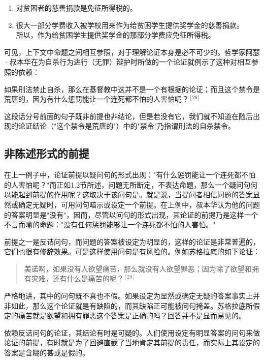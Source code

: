\begin{enumerate}
  \item 对贫困者的慈善捐款是免征所得税的。
  \item 很大一部分学费收入被学校用来作为给贫困学生提供奖学金的慈善捐款。\\
  所以，作为给贫困学生提供奖学金的那部分学费应免征所得税。
\end{enumerate}

可见，上下文中命题之间相互参照，对于理解论证本身是必不可少的。哲学家阿瑟·叔本华在为自杀行为进行（无罪）辩护时所做的一个论证就例示了这种对相互参照的依赖：

\begin{displayquote}
如果刑法禁止自杀，那么在基督教中这并不是一个有根据的论证；而且这个禁令是荒唐的，因为有什么惩罚能让一个连死都不怕的人害怕呢？${}^{[28]}$
\end{displayquote}

这段话分号前面的句子既非前提也非结论，但是若没有它，我们就不知道在随后出现的论证结论（"这个禁令是荒唐的"）中的"禁令"乃指谓刑法的自杀禁令。

\subsection{非陈述形式的前提}

在上一例子中，论证前提以疑问句的形式出现："有什么惩罚能让一个连死都不怕的人害怕呢？"而正如1.2节所述，问题无所断定，不表达命题，那么一个疑问句何以能起到前提的作用呢？这取决于该问句是。就是说，当提问者相信问题的答案显然或确定无疑时，可用问句暗示或设定一个前提。在上例中，叔本华认为他的问题的答案明显是"没有"，因而，尽管以问句的形式出现，其论证的前提乃是这样一个不言而喻的命题："没有任何惩罚能够让一个连死都不怕的人害怕。"

前提之一是反诘问句，而问题的答案被设定为明显的，这样的论证是非常普遍的，它们也很有修辞效果。可是这样使用问句是有风险的。例如苏格拉底的如下论证：

\begin{quotation}
美诺啊，如果没有人欲望痛苦，那么就没有人欲望罪恶；因为除了欲望和拥有灾难，还有什么是痛苦的呢？${}^{[29]}$
\end{quotation}

严格地讲，其中的问句既不真也不假。如果设定为显然或确定无疑的答案事实上并非如此，那么这个论证就是有缺陷的，而其缺陷正可能被问句掩盖。苏格拉底所假定的痛苦就是欲望和拥有罪恶这个答案是正确的吗？回答并不是显而易见的。

依赖反诘问句的论证，其结论有时是可疑的。人们使用设定有明显答案的问句来做论证的前提，有时就是为了回避直截了当地肯定其前提的责任，而实际上其设定的答案是含糊的甚或是假的。

